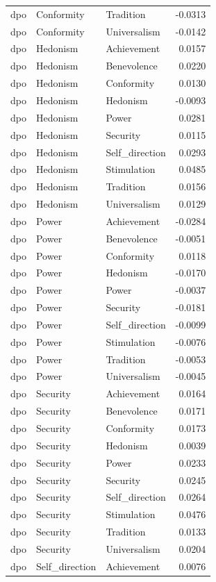\begin{tabular}{lllr}
dpo & Conformity & Tradition & -0.0313 \\
dpo & Conformity & Universalism & -0.0142 \\
dpo & Hedonism & Achievement & 0.0157 \\
dpo & Hedonism & Benevolence & 0.0220 \\
dpo & Hedonism & Conformity & 0.0130 \\
dpo & Hedonism & Hedonism & -0.0093 \\
dpo & Hedonism & Power & 0.0281 \\
dpo & Hedonism & Security & 0.0115 \\
dpo & Hedonism & Self\_direction & 0.0293 \\
dpo & Hedonism & Stimulation & 0.0485 \\
dpo & Hedonism & Tradition & 0.0156 \\
dpo & Hedonism & Universalism & 0.0129 \\
dpo & Power & Achievement & -0.0284 \\
dpo & Power & Benevolence & -0.0051 \\
dpo & Power & Conformity & 0.0118 \\
dpo & Power & Hedonism & -0.0170 \\
dpo & Power & Power & -0.0037 \\
dpo & Power & Security & -0.0181 \\
dpo & Power & Self\_direction & -0.0099 \\
dpo & Power & Stimulation & -0.0076 \\
dpo & Power & Tradition & -0.0053 \\
dpo & Power & Universalism & -0.0045 \\
dpo & Security & Achievement & 0.0164 \\
dpo & Security & Benevolence & 0.0171 \\
dpo & Security & Conformity & 0.0173 \\
dpo & Security & Hedonism & 0.0039 \\
dpo & Security & Power & 0.0233 \\
dpo & Security & Security & 0.0245 \\
dpo & Security & Self\_direction & 0.0264 \\
dpo & Security & Stimulation & 0.0476 \\
dpo & Security & Tradition & 0.0133 \\
dpo & Security & Universalism & 0.0204 \\
dpo & Self\_direction & Achievement & 0.0076 \\

\end{tabular}
